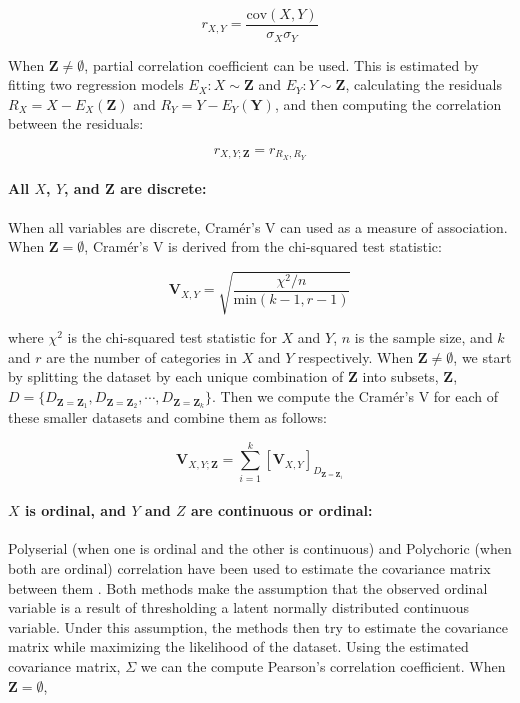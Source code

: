 \documentclass{uai2025} %
\begin{document}
\begin{equation}
	r_{X, Y} = \frac{\mathrm{cov}(X, Y)}{\sigma_X \sigma_Y}
\end{equation}

When $ \bm{Z} \neq \emptyset $, partial correlation coefficient can be used.
This is estimated by fitting two regression models $ E_X: X \sim \bm{Z} $ and $
E_Y: Y \sim \bm{Z} $, calculating the residuals $ R_X = X - E_X(\bm{Z}) $ and $
R_Y = Y - E_Y(\bm{Y}) $, and then computing the correlation between the
residuals:

\begin{equation}
	r_{X, Y; \bm{Z}} = r_{R_X, R_Y}
\end{equation}

\paragraph{All $ X $, $ Y $, and $ \bm{Z} $ are discrete: }

When all variables are discrete, Cram\'er's V can used as a measure of
association. When $ \bm{Z} = \emptyset $, Cram\'er's V is derived from the 
chi-squared test statistic:

\begin{equation}
	\mathbf{V}_{X, Y} = \sqrt{\frac{\chi^2 / n}{\mathrm{min}(k-1, r-1)}}
\end{equation}

where $ \chi^2 $ is the chi-squared test statistic for $ X $ and $ Y $, $ n $
is the sample size, and $ k $ and $ r $ are the number of categories in $ X $
and $ Y $ respectively. When $ \bm{Z} \neq \emptyset $, we start by splitting
the dataset by each unique combination of $ \bm{Z} $ into subsets,  $ \bm{Z} $,
$ D = \{ D_{\bm{Z} = \bm{Z}_1}, D_{\bm{Z} = \bm{Z}_2}, \cdots, D_{\bm{Z} =
\bm{Z}_k} \} $. Then we compute the Cram\'er's V for each of these smaller datasets
and combine them as follows:

\begin{equation}
	\mathbf{V}_{X, Y; \bm{Z}} = \sum_{i=1}^{k} \left[ \mathbf{V}_{X, Y} \right]_{D_{\bm{Z} = \bm{Z}_i}} 
\end{equation}

\paragraph{$ X $ is ordinal, and $ Y $ and $ Z $  are continuous or ordinal: }

Polyserial (when one is ordinal and the other is continuous) and Polychoric
(when both are ordinal) correlation have been used to estimate the covariance
matrix between them \citep{Poon1987}. Both methods make the assumption that the
observed ordinal variable is a result of thresholding a latent normally
distributed continuous variable. Under this assumption, the methods then try to
estimate the covariance matrix while maximizing the likelihood of the dataset.
Using the estimated covariance matrix, $ \Sigma $ we can the compute Pearson's
correlation coefficient. When $ \bm{Z} = \emptyset $,
\end{document}
